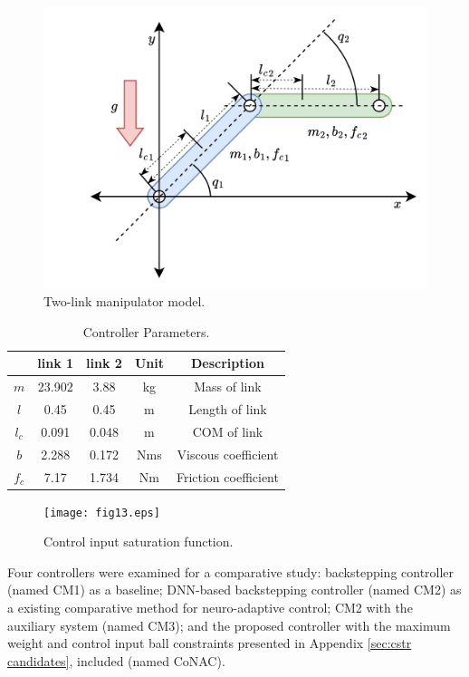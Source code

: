 \documentclass[lettersize,journal]{IEEEtran}
\begin{document}
\begin{figure}[!t]
    \centering
    \includegraphics[width=0.7\linewidth]{RobotModel.drawio.png}
    \caption{Two-link manipulator model.}
    \label{fig: manipulator}
\end{figure}

\begin{table}[!t]
    \renewcommand{\arraystretch}{1.3}
    \caption{Controller Parameters.}
    \label{table: error norm}
    \centering
    \begin{tabular}{|c||c|c|c|c|}
    \hline
    & \textbf{link 1} & \textbf{link 2} & \textbf{Unit} & \textbf{Description} \\
    \hline 
    $m$     & 23.902 & 3.88 & kg & Mass of link\\
    \hline
    $l$     & 0.45 & 0.45 & m & Length of link\\
    \hline
    $l_c$   & 0.091 & 0.048 &m & COM of link\\
    \hline
    $b$     &  2.288 & 0.172 & Nms & Viscous coefficient\\
    \hline
    $f_c$   &  7.17 & 1.734 & Nm & Friction coefficient\\
    \hline
    \end{tabular}
    \label{table: system parameters}
\end{table}

\begin{figure}[!t]
    \centering
    \texttt{[image: fig13.eps]}
    \caption{Control input saturation function.}
    \label{fig: h func}
\end{figure}



Four controllers were examined for a comparative study: backstepping controller (named CM1) as a baseline; DNN-based backstepping controller (named CM2) as a existing comparative method for neuro-adaptive control; CM2 with the auxiliary system (named CM3); and the proposed controller with the maximum weight and control input ball constraints presented in Appendix \ref{sec:cstr candidates}, included (named CoNAC).
\end{document}
